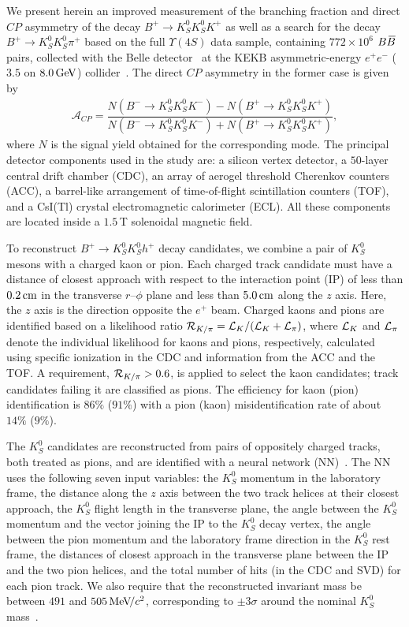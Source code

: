 \documentclass[aps,prl,preprint,tightenlines,superscriptaddress,,amsmath,byrevtex]{revtex4}
\def\pip    {\ensuremath{\pi^+}\xspace}
\def\Kp     {\ensuremath{K^+}\xspace}
\def\Km     {\ensuremath{K^-}\xspace}
\def\KS     {\ensuremath{K^0_{\scriptscriptstyle S}}\xspace}
\def\Bbar   {\kern 0.18em\overline{\kern -0.18em B}{}\xspace}
\def\BB     {\ensuremath{B\Bbar}\xspace}
\def\Bu     {\ensuremath{B^+}\xspace}
\def\Bub    {\ensuremath{B^-}\xspace}
\def\Bp     {\ensuremath{\Bu}\xspace}
\def\Bm     {\ensuremath{\Bub}\xspace}
\def\hu     {\ensuremath{h^+}\xspace}
\def\hp     {\ensuremath{\hu}\xspace}
\def\cm   {\ensuremath{{\rm \,cm}}\xspace}
\def\to{\ensuremath{\rightarrow}\xspace}
\def\CP {\ensuremath{C\!P}\xspace}
\def\ACP{{\ensuremath{\mathcal{A}_{\CP}}\xspace}}
\newcommand{\gev}{\ensuremath{\mathrm{\,Ge\kern -0.1em V}}\xspace}
\newcommand{\mevcc}{\ensuremath{{\mathrm{\,Me\kern -0.1em V\!/}c^2}}\xspace}
\begin{document}
We present herein an improved measurement of the branching fraction and direct $\CP$ asymmetry  of the decay $\Bp\to\KS\KS \Kp$ as well as a search for the decay $\Bp\to\KS\KS\pip$  based on the full $\Upsilon(4S)$ data sample, containing $772\times 10^6$  $\BB$ pairs, collected with the Belle
detector~\cite{Belle} at the KEKB asymmetric-energy $e^+e^-$ ($3.5$
on $8.0\gev$) collider~\cite{KEKB}. The direct $\CP$ asymmetry in the former case is given by 
\begin{eqnarray}
 \ACP = \dfrac{N (\Bm\to\KS\KS \Km) - N(\Bp\to\KS\KS \Kp)}{N(\Bm\to\KS\KS \Km) + N (\Bp\to\KS\KS \Kp)}, 
\end{eqnarray}
where $N$ is the signal yield obtained for the corresponding mode. The principal detector components used in the study are: a silicon vertex detector, a $50$-layer central drift chamber (CDC), an array of aerogel threshold Cherenkov counters (ACC), a barrel-like arrangement of time-of-flight scintillation counters (TOF), and a CsI(Tl) crystal electromagnetic calorimeter (ECL). All these components are located inside a $1.5$\,T solenoidal
magnetic field.

To reconstruct $\Bp\to\KS\KS\hp$ decay candidates, we combine a pair 
of $\KS$  mesons with a charged kaon or pion. Each charged track candidate must 
have a distance of closest approach with respect to the interaction point (IP) 
of less than $0.2\cm$ in the transverse $r$--$\phi$ plane and less than 
$5.0\cm$ along the $z$ axis. Here, the $z$ axis is the direction
opposite the $e^+$ beam. Charged kaons and pions are identified based on a 
likelihood ratio ${\cal R}_{K/\pi}={{\cal L}_K}/({\cal L}_K+{\cal L}_\pi)$, 
where ${\cal L}_K$ and ${\cal L}_\pi$ denote the individual likelihood 
for kaons and pions, respectively, calculated using specific ionization 
in the CDC and information from the ACC and the TOF. A requirement, 
${\cal R}_{K/\pi}>0.6$, is applied to select the kaon candidates; track candidates 
failing it are classified as pions. The efficiency for kaon 
(pion) identification is $86\%$ ($91\%$) with a pion (kaon) misidentification rate of 
about $14\%$ ($9\%$).

The $\KS$ candidates are reconstructed from pairs of oppositely charged 
tracks, both treated as pions, and are identified with a neural network 
(NN)~\cite{neurobayes}. The NN uses the following seven input variables: the 
$\KS$ momentum in the laboratory frame, the distance along the $z$ axis 
between the two track helices at their closest approach, the $\KS$ flight length 
in the transverse plane, the angle between the $\KS$ momentum and the vector 
joining the IP to the $\KS$ decay vertex, the angle between the pion 
momentum and the laboratory frame direction in the $\KS$ rest frame, the 
distances of closest approach in the transverse plane between the IP and the two 
pion helices, and the total number of hits (in the CDC and SVD) for each 
pion track. We also require that the reconstructed invariant mass be 
between $491$ and $505 \mevcc$, corresponding to $\pm 3\sigma$ 
around the nominal $\KS$ mass~\cite{PDG}. 
\end{document}

